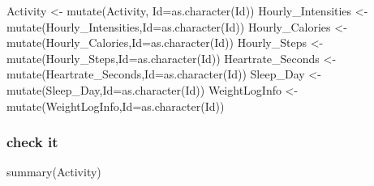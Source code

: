\documentclass[
]{article}
\newenvironment{Shaded}{\begin{snugshade}}{\end{snugshade}}
\newcommand{\AttributeTok}[1]{\textcolor[rgb]{0.77,0.63,0.00}{#1}}
\newcommand{\FunctionTok}[1]{\textcolor[rgb]{0.00,0.00,0.00}{#1}}
\newcommand{\NormalTok}[1]{#1}
\newcommand{\OtherTok}[1]{\textcolor[rgb]{0.56,0.35,0.01}{#1}}
\newcommand{\StringTok}[1]{\textcolor[rgb]{0.31,0.60,0.02}{#1}}
\begin{document}
\begin{Shaded}
\begin{Highlighting}[]
\NormalTok{Activity }\OtherTok{\textless{}{-}} \FunctionTok{mutate}\NormalTok{(Activity, }\AttributeTok{Id=}\FunctionTok{as.character}\NormalTok{(}\StringTok{\textquotesingle{}Id\textquotesingle{}}\NormalTok{))}
\NormalTok{Hourly\_Intensities }\OtherTok{\textless{}{-}}\FunctionTok{mutate}\NormalTok{(Hourly\_Intensities,}\AttributeTok{Id=}\FunctionTok{as.character}\NormalTok{(}\StringTok{\textquotesingle{}Id\textquotesingle{}}\NormalTok{))}
\NormalTok{Hourly\_Calories }\OtherTok{\textless{}{-}} \FunctionTok{mutate}\NormalTok{(Hourly\_Calories,}\AttributeTok{Id=}\FunctionTok{as.character}\NormalTok{(}\StringTok{\textquotesingle{}Id\textquotesingle{}}\NormalTok{))}
\NormalTok{Hourly\_Steps }\OtherTok{\textless{}{-}} \FunctionTok{mutate}\NormalTok{(Hourly\_Steps,}\AttributeTok{Id=}\FunctionTok{as.character}\NormalTok{(}\StringTok{\textquotesingle{}Id\textquotesingle{}}\NormalTok{))}
\NormalTok{Heartrate\_Seconds }\OtherTok{\textless{}{-}} \FunctionTok{mutate}\NormalTok{(Heartrate\_Seconds,}\AttributeTok{Id=}\FunctionTok{as.character}\NormalTok{(}\StringTok{\textquotesingle{}Id\textquotesingle{}}\NormalTok{))}
\NormalTok{Sleep\_Day }\OtherTok{\textless{}{-}} \FunctionTok{mutate}\NormalTok{(Sleep\_Day,}\AttributeTok{Id=}\FunctionTok{as.character}\NormalTok{(}\StringTok{\textquotesingle{}Id\textquotesingle{}}\NormalTok{))}
\NormalTok{WeightLogInfo }\OtherTok{\textless{}{-}}\FunctionTok{mutate}\NormalTok{(WeightLogInfo,}\AttributeTok{Id=}\FunctionTok{as.character}\NormalTok{(}\StringTok{\textquotesingle{}Id\textquotesingle{}}\NormalTok{))}
\end{Highlighting}
\end{Shaded}

\hypertarget{check-it}{%
\subsubsection{check it}\label{check-it}}

\begin{Shaded}
\begin{Highlighting}[]
\FunctionTok{summary}\NormalTok{(Activity)}
\end{Highlighting}
\end{Shaded}
\end{document}
